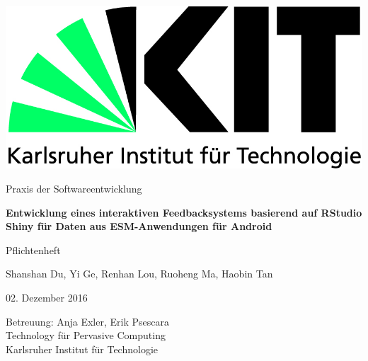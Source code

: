 \documentclass[a4paper]{scrreprt}
\begin{document}
 
    \begin{flushright}
        \includegraphics[scale = 0.7]{kit-logo.jpg}\\[0.5cm]
    \end{flushright}
    \vspace*{2cm} 

    \begin{center} \large 
    
        Praxis der Softwareentwicklung
        \vspace * {1.5cm}

        {\bf \huge Entwicklung eines interaktiven Feedbacksystems basierend auf RStudio Shiny f\"ur Daten aus ESM-Anwendungen f\"ur Android}
        \vspace*{1cm}

        Pflichtenheft
        \vspace*{2cm}

        Shanshan Du, Yi Ge, Renhan Lou, Ruoheng Ma, Haobin Tan
        \vspace*{1cm}

        02. Dezember 2016
        \vspace*{3.5cm}


        Betreuung: Anja Exler, Erik Psescara\\[1cm]
        Technology f\"ur Pervasive Computing\\[0.5cm]
        Karlsruher Institut für Technologie
    \end{center}
 
\end{document}
